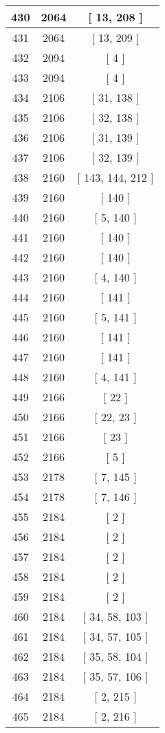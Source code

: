 \begin{center}
\begin{longtable}[H]{|| c c c ||}
\hline
430 & 2064 & [ 13, 208 ] \\ 
\hline
431 & 2064 & [ 13, 209 ] \\ 
\hline
432 & 2094 & [ 4 ] \\ 
\hline
433 & 2094 & [ 4 ] \\ 
\hline
434 & 2106 & [ 31, 138 ] \\ 
\hline
435 & 2106 & [ 32, 138 ] \\ 
\hline
436 & 2106 & [ 31, 139 ] \\ 
\hline
437 & 2106 & [ 32, 139 ] \\ 
\hline
438 & 2160 & [ 143, 144, 212 ] \\ 
\hline
439 & 2160 & [ 140 ] \\ 
\hline
440 & 2160 & [ 5, 140 ] \\ 
\hline
441 & 2160 & [ 140 ] \\ 
\hline
442 & 2160 & [ 140 ] \\ 
\hline
443 & 2160 & [ 4, 140 ] \\ 
\hline
444 & 2160 & [ 141 ] \\ 
\hline
445 & 2160 & [ 5, 141 ] \\ 
\hline
446 & 2160 & [ 141 ] \\ 
\hline
447 & 2160 & [ 141 ] \\ 
\hline
448 & 2160 & [ 4, 141 ] \\ 
\hline
449 & 2166 & [ 22 ] \\ 
\hline
450 & 2166 & [ 22, 23 ] \\ 
\hline
451 & 2166 & [ 23 ] \\ 
\hline
452 & 2166 & [ 5 ] \\ 
\hline
453 & 2178 & [ 7, 145 ] \\ 
\hline
454 & 2178 & [ 7, 146 ] \\ 
\hline
455 & 2184 & [ 2 ] \\ 
\hline
456 & 2184 & [ 2 ] \\ 
\hline
457 & 2184 & [ 2 ] \\ 
\hline
458 & 2184 & [ 2 ] \\ 
\hline
459 & 2184 & [ 2 ] \\ 
\hline
460 & 2184 & [ 34, 58, 103 ] \\ 
\hline
461 & 2184 & [ 34, 57, 105 ] \\ 
\hline
462 & 2184 & [ 35, 58, 104 ] \\ 
\hline
463 & 2184 & [ 35, 57, 106 ] \\ 
\hline
464 & 2184 & [ 2, 215 ] \\ 
\hline
465 & 2184 & [ 2, 216 ] \\ 

\end{longtable}
\end{center}
